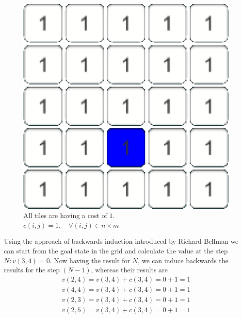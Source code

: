 \documentclass[conference]{IEEEtran}
\begin{document}
\begin{figure}[h]
\centering
\begin{minipage}[t]{0.3\linewidth}
\centering
\includegraphics[width=1\textwidth]{images/ValueFunction/original.png}
\end{minipage}
\caption{All tiles are having a cost of
$1$.\\
$c(i,j) = 1, \quad \forall (i,j) \in n \times m$}
\end{figure}
Using the approach of backwards induction introduced by Richard Bellman we can start from the goal state in the grid and calculate the value at the step $N: v(3,4) = 0$.
Now having the result for $N$, we can induce backwards the results for the step $(N-1)$, whereas their results are
\begin{align}
v(2,4) = v(3,4) + c(3,4) = 0 + 1 = 1\\
v(4,4) = v(3,4) + c(3,4) = 0 + 1 = 1\\
v(2,3) = v(3,4) + c(3,4) = 0 + 1 = 1\\
v(2,5) = v(3,4) + c(3,4) = 0 + 1 = 1
\end{align}
\end{document}
